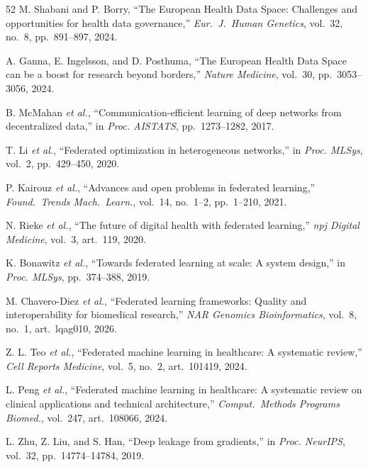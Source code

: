 \documentclass[conference]{IEEEtran}
\begin{document}
\begin{thebibliography}{52}
M. Shabani and P. Borry, ``The European Health Data Space: Challenges and opportunities for health data governance,'' \textit{Eur.~J.~Human Genetics}, vol.~32, no.~8, pp.~891--897, 2024.

A. Ganna, E. Ingelsson, and D. Posthuma, ``The European Health Data Space can be a boost for research beyond borders,'' \textit{Nature Medicine}, vol.~30, pp.~3053--3056, 2024.

B. McMahan \textit{et al.}, ``Communication-efficient learning of deep networks from decentralized data,'' in \textit{Proc. AISTATS}, pp.~1273--1282, 2017.

T. Li \textit{et al.}, ``Federated optimization in heterogeneous networks,'' in \textit{Proc. MLSys}, vol.~2, pp.~429--450, 2020.

P. Kairouz \textit{et al.}, ``Advances and open problems in federated learning,'' \textit{Found.~Trends Mach.~Learn.}, vol.~14, no.~1--2, pp.~1--210, 2021.

N. Rieke \textit{et al.}, ``The future of digital health with federated learning,'' \textit{npj Digital Medicine}, vol.~3, art.~119, 2020.

K. Bonawitz \textit{et al.}, ``Towards federated learning at scale: A system design,'' in \textit{Proc. MLSys}, pp.~374--388, 2019.

M. Chavero-Diez \textit{et al.}, ``Federated learning frameworks: Quality and interoperability for biomedical research,'' \textit{NAR Genomics Bioinformatics}, vol.~8, no.~1, art.~lqag010, 2026.

Z. L. Teo \textit{et al.}, ``Federated machine learning in healthcare: A systematic review,'' \textit{Cell Reports Medicine}, vol.~5, no.~2, art.~101419, 2024.

L. Peng \textit{et al.}, ``Federated machine learning in healthcare: A systematic review on clinical applications and technical architecture,'' \textit{Comput.~Methods Programs Biomed.}, vol.~247, art.~108066, 2024.

L. Zhu, Z. Liu, and S. Han, ``Deep leakage from gradients,'' in \textit{Proc. NeurIPS}, vol.~32, pp.~14774--14784, 2019.


\end{thebibliography}
\end{document}
